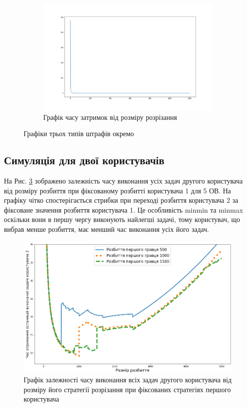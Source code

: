 \begin{figure}[H]
	\begin{subfigure}[b]{0.5\linewidth}
		\centering
		\includegraphics[width=\textwidth]{practice/img/latency_time_sep}
		\caption{Графік часу затримок від розміру розрізання}
		\label{fig:latency_time_sep}
	\end{subfigure}
	\caption{Графіки трьох типів штрафів окремо}
	\label{fig:three_types_penalties}	
\end{figure}

\subsection{Симуляція для двої користувачів}

На Рис. \ref{fig:two_users_fixed_first} зображено залежність часу виконання усіх задач другого користувача від розміру розбиття при фіксованому розбитті користувача 1 для 5 ОВ. На графіку чітко спостерігається стрибки при переході розбиття користувача 2 за фіксоване значення розбиття користувача 1. Це особливість minmin та minmax оскільки вони в першу чергу виконують найлегші задачі, тому користувач, що вибрав менше розбиття, має менший час виконання усіх його задач.

\begin{figure}[H]
	\centering
	\includegraphics[width=\textwidth]{practice/img/two_users_fixed_first}
	\caption{Графік залежності часу виконання всіх задач другого користувача від розміру його стратегії розрізання при фіксованих стратегіях першого користувача}
	\label{fig:two_users_fixed_first}
\end{figure}

